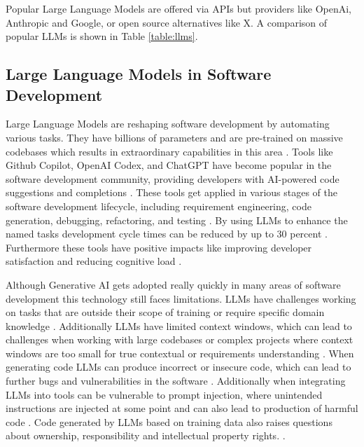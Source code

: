 Popular Large Language Models are offered via APIs but providers like OpenAi, Anthropic and Google, or open source alternatives like X. A comparison of popular LLMs is shown in Table \ref{table:llms}.

\subsection{Large Language Models in Software Development}

Large Language Models are reshaping software development by automating various tasks. They have billions of parameters and are pre-trained on massive codebases which results in extraordinary capabilities in this area \cite{chenUnveilingPitfallsUnderstanding2025}. Tools like Github Copilot, OpenAI Codex, and ChatGPT have become popular in the software development community, providing developers with AI-powered code suggestions and completions \cite{bhargavmallampatiRoleGenerativeAI2025}. These tools get applied in various stages of the software development lifecycle, including requirement engineering, code generation, debugging, refactoring, and testing \cite{houLargeLanguageModels2024, puvvadiCodingAgentsComprehensive2025,bhargavmallampatiRoleGenerativeAI2025}. By using LLMs to enhance the named tasks development cycle times can be reduced by up to 30 percent \cite{bhargavmallampatiRoleGenerativeAI2025,kalliamvakouResearchQuantifyingGitHub2022}. Furthermore these tools have positive impacts like improving developer satisfaction and reducing cognitive load \cite{kalliamvakouResearchQuantifyingGitHub2022}.

Although Generative AI gets adopted really quickly in many areas of software development this technology still faces limitations. LLMs have challenges working on tasks that are outside their scope of training or require specific domain knowledge \cite{houLargeLanguageModels2024}. Additionally LLMs have limited context windows, which can lead to challenges when working with large codebases or complex projects where context windows are too small for true contextual or requirements understanding \cite{bhargavmallampatiRoleGenerativeAI2025}. When generating code LLMs can produce incorrect or insecure code, which can lead to further bugs and vulnerabilities in the software \cite{houLargeLanguageModels2024, bhargavmallampatiRoleGenerativeAI2025}. Additionally when integrating LLMs into tools can be vulnerable to prompt injection, where unintended instructions are injected at some point and can also lead to production of harmful code \cite{liuPromptInjectionAttack2024}. Code generated by LLMs based on training data also raises questions about ownership, responsibility and intellectual property rights. \cite{sauvolaFutureSoftwareDevelopment2024, houLargeLanguageModels2024}.

